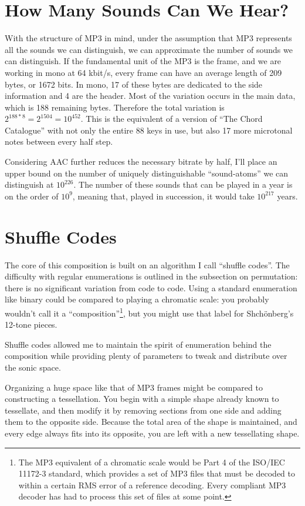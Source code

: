 \documentclass{thesis}
\begin{document}
\section{How Many Sounds Can We Hear?}

With the structure of MP3 in mind, under the assumption that MP3 represents all the sounds we can distinguish, we can approximate the number of sounds we can distinguish. If the fundamental unit of the MP3 is the frame, and we are working in mono at 64 kbit/s, every frame can have an average length of 209 bytes, or 1672 bits. In mono, 17 of these bytes are dedicated to the side information and 4 are the header. Most of the variation occurs in the main data, which is 188 remaining bytes. Therefore the total variation is $2^{188*8}=2^{1504}=10^{452}$. This is the equivalent of a version of ``The Chord Catalogue'' with not only the entire 88 keys in use, but also 17 more microtonal notes between every half step.

Considering AAC further reduces the necessary bitrate by half, I'll place an upper bound on the number of uniquely distinguishable ``sound-atoms'' we can distinguish at $10^{226}$. The number of these sounds that can be played in a year is on the order of $10^9$, meaning that, played in succession, it would take $10^{217}$ years.
	
\section{Shuffle Codes}

The core of this composition is built on an algorithm I call ``shuffle codes''. The difficulty with regular enumerations is outlined in the subsection on permutation: there is no significant variation from code to code. Using a standard enumeration like binary could be compared to playing a chromatic scale: you probably wouldn't call it a ``composition''\footnote{The MP3 equivalent of a chromatic scale would be Part 4 of the ISO/IEC 11172-3 standard, which provides a set of MP3 files that must be decoded to within a certain RMS error of a reference decoding. Every compliant MP3 decoder has had to process this set of files at some point.}, but you might use that label for Shch\"onberg's 12-tone pieces.

Shuffle codes allowed me to maintain the spirit of enumeration behind the composition while providing plenty of parameters to tweak and distribute over the sonic space.

Organizing a huge space like that of MP3 frames might be compared to constructing a tessellation. You begin with a simple shape already known to tessellate, and then modify it by removing sections from one side and adding them to the opposite side. Because the total area of the shape is maintained, and every edge always fits into its opposite, you are left with a new tessellating shape.
\end{document}

